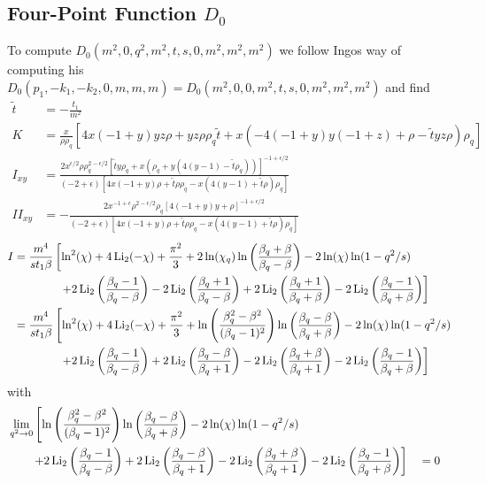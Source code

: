 \subsection[Four-Point Function D0]{Four-Point Function $D_0$}
To compute $D_0(m^2,0,q^2,m^2,t,s,0,m^2,m^2,m^2)$ we follow Ingos way\cite{Bojak:2000eu} of computing his $D_0(p_1,-k_1,-k_2,0,m,m,m)=D_0(m^2,0,0,m^2,t,s,0,m^2,m^2,m^2)$ and find
\begin{align}
\tilde t &= -\frac{t_1}{m^2}\\
K &= \frac x {\rho \rho_q}\left[4 x (-1+y) y z \rho+yz \rho\rho_q\tilde t +x (-4 (-1+y) y (-1+z)+\rho-\tilde t y z \rho) \rho_q\right]\\
I_{xy} &= \frac{2 x^{\epsilon/2} \rho\rho_q^{2-\epsilon/2} \left[\tilde t y \rho_q+x (\rho_q+y (4 (y-1)-\tilde t \rho_q))\right]^{-1+\epsilon/2}}{(-2+\epsilon) \left[4 x (-1+y) \rho+\tilde t \rho \rho_q-x (4(y-1)+\tilde t \rho) \rho_q\right]}\\
II_{xy} &= -\frac{2 x^{-1+\epsilon} \rho^{2-\epsilon/2} \rho_q \left[4 (-1+y) y+\rho\right]^{-1+\epsilon/2} }{(-2+\epsilon) \left[4 x (-1+y) \rho+\tilde t \rho \rho_q-x (4(y-1)+\tilde t \rho) \rho_q\right]}
\end{align}
\begin{align}
I &= \frac{m^4}{s t_1 \beta}\left[\ln^2(\chi)+4\operatorname{\text{Li}_2}(-\chi)+\frac{\pi^2}3 +2\ln(\chi_q)\ln\left(\frac{\beta_q+\beta}{\beta_q-\beta}\right)-2\ln(\chi)\ln(1-q^2/s)\right.\nonumber\\
 &\hspace{40pt}\left. + 2\operatorname{\text{Li}_2}\left(\frac{\beta_q-1}{\beta_q-\beta}\right)-2\operatorname{\text{Li}_2}\left(\frac{\beta_q+1}{\beta_q-\beta}\right)+2\operatorname{\text{Li}_2}\left(\frac{\beta_q+1}{\beta_q+\beta}\right)-2\operatorname{\text{Li}_2}\left(\frac{\beta_q-1}{\beta_q+\beta}\right) \right]\\
&= \frac{m^4}{s t_1 \beta}\left[\ln^2(\chi)+4\operatorname{\text{Li}_2}(-\chi)+\frac{\pi^2}3 +\ln\left(\frac{\beta_q^2-\beta^2}{(\beta_q-1)^2}\right)\ln\left(\frac{\beta_q-\beta}{\beta_q+\beta}\right)-2\ln(\chi)\ln(1-q^2/s)\right.\nonumber\\
 &\hspace{40pt}\left. + 2\operatorname{\text{Li}_2}\left(\frac{\beta_q-1}{\beta_q-\beta}\right)+2\operatorname{\text{Li}_2}\left(\frac{\beta_q-\beta}{\beta_q+1}\right)-2\operatorname{\text{Li}_2}\left(\frac{\beta_q+\beta}{\beta_q+1}\right)-2\operatorname{\text{Li}_2}\left(\frac{\beta_q-1}{\beta_q+\beta}\right) \right]
\end{align}
with
\begin{align}
&\lim_{q^2\rightarrow 0}\left[\ln\left(\frac{\beta_q^2-\beta^2}{(\beta_q-1)^2}\right)\ln\left(\frac{\beta_q-\beta}{\beta_q+\beta}\right)-2\ln(\chi)\ln(1-q^2/s)\right.\nonumber\\
 &\hspace{20pt}\left. + 2\operatorname{\text{Li}_2}\left(\frac{\beta_q-1}{\beta_q-\beta}\right)+2\operatorname{\text{Li}_2}\left(\frac{\beta_q-\beta}{\beta_q+1}\right)-2\operatorname{\text{Li}_2}\left(\frac{\beta_q+\beta}{\beta_q+1}\right)-2\operatorname{\text{Li}_2}\left(\frac{\beta_q-1}{\beta_q+\beta}\right) \right]&&=0
\end{align}
